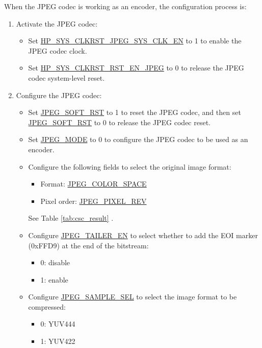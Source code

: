 \documentclass[main\_\_EN.tex]{subfiles}
\begin{document}
When the JPEG codec is working as an encoder, the configuration process is:
\begin{enumerate}
    \item Activate the JPEG codec:
    \begin{itemize}
        \item Set \hyperref[fielddesc:HPSYSCLKRSTJPEGSYSCLKEN]{HP\_SYS\_CLKRST\_JPEG\_SYS\_CLK\_EN} to 1 to enable the JPEG codec clock.
        \item Set \hyperref[fielddesc:HPSYSCLKRSTRSTENJPEG]{HP\_SYS\_CLKRST\_RST\_EN\_JPEG} to 0 to release the JPEG codec system-level reset.
    \end{itemize}
    \item Configure the JPEG codec:
    \begin{itemize}
        \item Set \hyperref[fielddesc:JPEGSOFTRST]{JPEG\_SOFT\_RST} to 1 to reset the JPEG codec, and then set \hyperref[fielddesc:JPEGSOFTRST]{JPEG\_SOFT\_RST} to 0 to release the JPEG codec reset.
        \item Set \hyperref[fielddesc:JPEGMODE]{JPEG\_MODE} to 0 to configure the JPEG codec to be used as an encoder.
        \item Configure the following fields to select the original image format:
        \begin{itemize}
            \item Format: \hyperref[fielddesc:JPEGCOLORSPACE]{JPEG\_COLOR\_SPACE}
            \item Pixel order: \hyperref[fielddesc:JPEGPIXELREV]{JPEG\_PIXEL\_REV}
        \end{itemize}
        See Table \ref{tab:csc_result} \textit{}.
        \item Configure \hyperref[fielddesc:JPEGTAILEREN]{JPEG\_TAILER\_EN} to select whether to add the EOI marker (0xFFD9) at the end of the bitstream:
        \begin{itemize}
            \item 0: disable
            \item 1: enable
        \end{itemize}
        \item Configure \hyperref[fielddesc:JPEGSAMPLESEL]{JPEG\_SAMPLE\_SEL} to select the image format to be compressed:
                \begin{itemize}
                    \item 0: YUV444
                    \item 1: YUV422

\end{itemize}
\end{itemize}
\end{enumerate}
\end{document}
